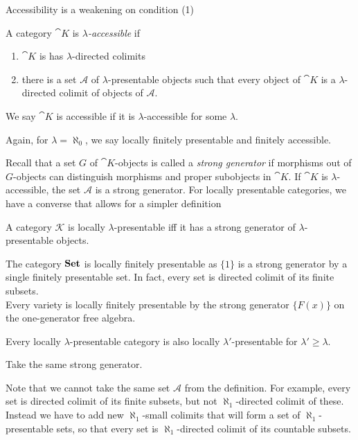 Accessibility is a weakening on condition (1)

\begin{Definition}
A category $\cat K$ is \emph{$\lambda$-accessible} if
\begin{enumerate}
\item $\cat K$ is has $\lambda$-directed colimits
\item there is a set $\mathcal A$ of $\lambda$-presentable objects such that every object of $\cat K$ is a $\lambda$-directed colimit of objects of $\mathcal A$.
\end{enumerate}
We say $\cat K$ is accessible if it is $\lambda$-accessible for some $\lambda$.
\end{Definition}

Again, for $\lambda = \aleph_0$, we say locally finitely presentable and finitely accessible. 

Recall that a set $G$ of $\cat K$-objects is called a \emph{strong generator} if morphisms out of $G$-objects can distinguish morphisms and proper subobjects in $\cat K$. If $\cat K$ is $\lambda$-accessible, the set $\mathcal A$ is a strong generator. For locally presentable categories, we have a converse that allows for a simpler definition
\begin{Proposition}
A category $\mathcal K$ is locally $\lambda$-presentable iff it has a strong generator of $\lambda$-presentable objects. 
\end{Proposition}
\begin{Corollary} The category $\mathbf{Set}$ is locally finitely presentable as $\{1\}$ is a strong generator by a single finitely presentable set. In fact, every set is directed colimit of its finite subsets. \\

Every variety is locally finitely presentable by the strong generator $\{ F(x) \}$ on the one-generator free algebra. 
\end{Corollary}

\begin{Corollary}\label{coro:raise}
Every locally $\lambda$-presentable category is also locally $\lambda'$-presentable for $\lambda' \geq \lambda$.
\end{Corollary}
\begin{Proof}
Take the same strong generator.
\end{Proof}

Note that we cannot take the same set $\mathcal A$ from the definition. For example, every set is directed colimit of its finite subsets, but not $\aleph_1$-directed colimit of these. Instead we have to add new $\aleph_1$-small colimits that will form a set of $\aleph_1$-presentable sets, so that every set is $\aleph_1$-directed colimit of its countable subsets. \\

